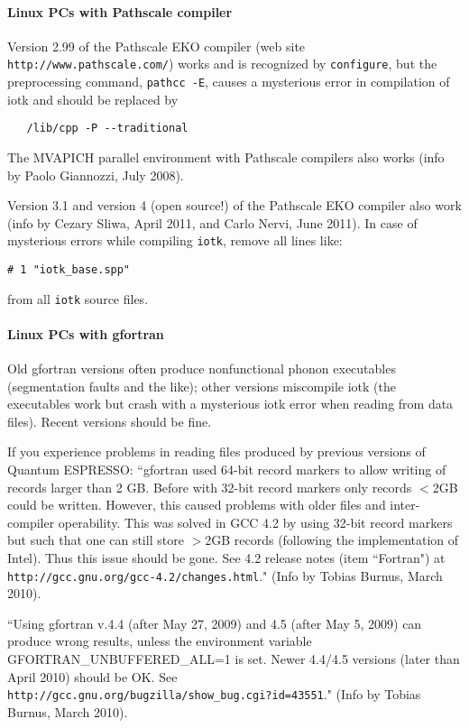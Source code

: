 \documentclass[12pt,a4paper]{article}
\def\qe{{\sc Quantum ESPRESSO}}
\def\configure{\texttt{configure}}
\begin{document}
\paragraph{Linux PCs with Pathscale compiler}

Version 2.99 of the Pathscale EKO compiler (web site
\texttt{http://www.pathscale.com/})
works and is recognized by
\configure, but the preprocessing command, \texttt{pathcc -E},
causes a mysterious error in compilation of iotk and should be replaced by
\begin{verbatim}
   /lib/cpp -P --traditional
\end{verbatim}
The MVAPICH parallel environment with Pathscale compilers also works
(info by Paolo Giannozzi, July 2008). 

Version 3.1 and version 4 (open source!) of the Pathscale EKO compiler
also work (info by Cezary Sliwa, April 2011, and Carlo Nervi, June 2011).
In case of mysterious errors while compiling \texttt{iotk},
remove all lines like:
\begin{verbatim}
# 1 "iotk_base.spp"
\end{verbatim}
from all \texttt{iotk} source files.

\paragraph{Linux PCs with gfortran}

Old gfortran versions often produce nonfunctional
phonon executables (segmentation faults and the like); other versions
miscompile iotk (the executables work but crash with a mysterious iotk
error when reading from data files). Recent versions should be fine.

If you experience problems in reading files produced by previous versions
of \qe: ``gfortran used 64-bit record markers to allow writing of records 
larger than 2 GB. Before with 32-bit record markers only records $<$2GB 
could be written. However, this caused problems with older files and 
inter-compiler operability. This was solved in GCC 4.2 by using 32-bit 
record markers but such that one can still store $>$2GB records (following 
the implementation of Intel). Thus this issue should be gone. See 4.2 
release notes (item ``Fortran") at 
\texttt{http://gcc.gnu.org/gcc-4.2/changes.html}."
(Info by Tobias Burnus, March 2010).

``Using gfortran v.4.4 (after May 27, 2009) and 4.5 (after May 5, 2009) can 
produce wrong results, unless the environment variable
GFORTRAN\_UNBUFFERED\_ALL=1 is set. Newer 4.4/4.5 versions
(later than April 2010) should be OK. See\\
\texttt{http://gcc.gnu.org/bugzilla/show\_bug.cgi?id=43551}."
(Info by Tobias Burnus, March 2010).
\end{document}
